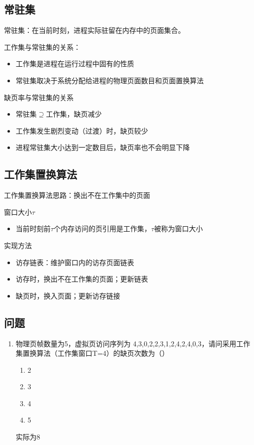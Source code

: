 \subsection{常驻集}
常驻集：在当前时刻，进程实际驻留在内存中的页面集合。
\par 工作集与常驻集的关系：
\begin{itemize}
	\item 工作集是进程在运行过程中固有的性质
	\item 常驻集取决于系统分配给进程的物理页面数目和页面置换算法
\end{itemize}
\par 缺页率与常驻集的关系
\begin{itemize}
	\item 常驻集$\supseteq$工作集，缺页减少
	\item 工作集发生剧烈变动（过渡）时，缺页较少
	\item 进程常驻集大小达到一定数目后，缺页率也不会明显下降
\end{itemize}
\subsection{工作集置换算法}
工作集置换算法思路：换出不在工作集中的页面
\par 窗口大小$\tau$
\begin{itemize}
	\item 当前时刻前$\tau$个内存访问的页引用是工作集，$\tau$被称为窗口大小
\end{itemize}
实现方法
\begin{itemize}
	\item 访存链表：维护窗口内的访存页面链表
	\item 访存时，换出不在工作集的页面；更新链表
	\item 缺页时，换入页面；更新访存链接
\end{itemize}
\subsection{问题}
\begin{enumerate}
	\item 物理页帧数量为5，虚拟页访问序列为 4,3,0,2,2,3,1,2,4,2,4,0,3，请问采用工作集置换算法（工作集窗口T=4）的缺页次数为（）
	\begin{enumerate}[A]
		\item 2
		\item 3
		\item 4
		\item 5
	\end{enumerate}
实际为8
\end{enumerate}


